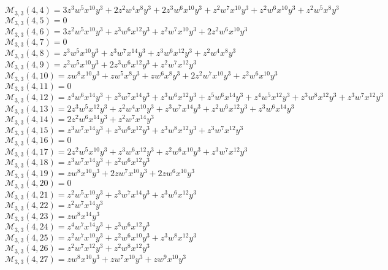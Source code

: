 $\mathcal{M}_{3,3}(4,4)=3z^3w^5x^{10}y^3+2z^2w^4x^8y^3+2z^3w^6x^{10}y^3+z^2w^7x^{10}y^3+z^2w^6x^{10}y^3+z^2w^5x^8y^3$\\
$\mathcal{M}_{3,3}(4,5)=0$\\
$\mathcal{M}_{3,3}(4,6)=3z^2w^5x^{10}y^3+z^3w^6x^{12}y^3+z^2w^7x^{10}y^3+2z^2w^6x^{10}y^3$\\
$\mathcal{M}_{3,3}(4,7)=0$\\
$\mathcal{M}_{3,3}(4,8)=z^3w^5x^{10}y^3+z^3w^7x^{14}y^3+z^3w^6x^{12}y^3+z^2w^4x^8y^3$\\
$\mathcal{M}_{3,3}(4,9)=z^2w^5x^{10}y^3+2z^3w^6x^{12}y^3+z^2w^7x^{12}y^3$\\
$\mathcal{M}_{3,3}(4,10)=zw^8x^{10}y^3+zw^5x^8y^3+zw^6x^8y^3+2z^2w^7x^{10}y^3+z^2w^6x^{10}y^3$\\
$\mathcal{M}_{3,3}(4,11)=0$\\
$\mathcal{M}_{3,3}(4,12)=z^4w^6x^{14}y^3+z^3w^7x^{14}y^3+z^3w^6x^{12}y^3+z^5w^6x^{14}y^3+z^4w^5x^{12}y^3+z^3w^8x^{12}y^3+z^3w^7x^{12}y^3$\\
$\mathcal{M}_{3,3}(4,13)=2z^3w^5x^{12}y^3+z^2w^4x^{10}y^3+z^3w^7x^{14}y^3+z^2w^6x^{12}y^3+z^3w^6x^{14}y^3$\\
$\mathcal{M}_{3,3}(4,14)=2z^2w^6x^{14}y^3+z^2w^7x^{14}y^3$\\
$\mathcal{M}_{3,3}(4,15)=z^3w^7x^{14}y^3+z^3w^6x^{12}y^3+z^3w^8x^{12}y^3+z^3w^7x^{12}y^3$\\
$\mathcal{M}_{3,3}(4,16)=0$\\
$\mathcal{M}_{3,3}(4,17)=2z^2w^5x^{10}y^3+z^3w^6x^{12}y^3+z^2w^6x^{10}y^3+z^3w^7x^{12}y^3$\\
$\mathcal{M}_{3,3}(4,18)=z^3w^7x^{14}y^3+z^2w^6x^{12}y^3$\\
$\mathcal{M}_{3,3}(4,19)=zw^8x^{10}y^3+2zw^7x^{10}y^3+2zw^6x^{10}y^3$\\
$\mathcal{M}_{3,3}(4,20)=0$\\
$\mathcal{M}_{3,3}(4,21)=z^2w^5x^{10}y^3+z^3w^7x^{14}y^3+z^3w^6x^{12}y^3$\\
$\mathcal{M}_{3,3}(4,22)=z^2w^7x^{14}y^3$\\
$\mathcal{M}_{3,3}(4,23)=zw^8x^{14}y^3$\\
$\mathcal{M}_{3,3}(4,24)=z^4w^7x^{14}y^3+z^3w^6x^{12}y^3$\\
$\mathcal{M}_{3,3}(4,25)=z^2w^7x^{10}y^3+z^2w^6x^{10}y^3+z^3w^8x^{12}y^3$\\
$\mathcal{M}_{3,3}(4,26)=z^2w^7x^{12}y^3+z^2w^8x^{12}y^3$\\
$\mathcal{M}_{3,3}(4,27)=zw^8x^{10}y^3+zw^7x^{10}y^3+zw^9x^{10}y^3$\\
